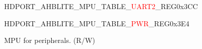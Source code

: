 \vspace{-3em}
\begin{register}{H}{DPORT\_AHBLITE\_MPU\_TABLE\_\textcolor{red}{UART2}\_REG}{0x3CC}\label{regdesc:AHBLITEMPUTABLEUART2REG}
\end{register}
\vspace{-3em}
\begin{register}{H}{DPORT\_AHBLITE\_MPU\_TABLE\_\textcolor{red}{PWR}\_REG}{0x3E4}\label{regdesc:AHBLITEMPUTABLEPWRREG}
%
%
\regnewline%
\begin{regdesc}\begin{reglist}
\item [DPORT\_AHBLITE\_\textcolor{red}{*}\_ACCESS\_GRANT\_CONFIG]MPU for peripherals. (R/W)
\end{reglist}\end{regdesc}
\end{register}







